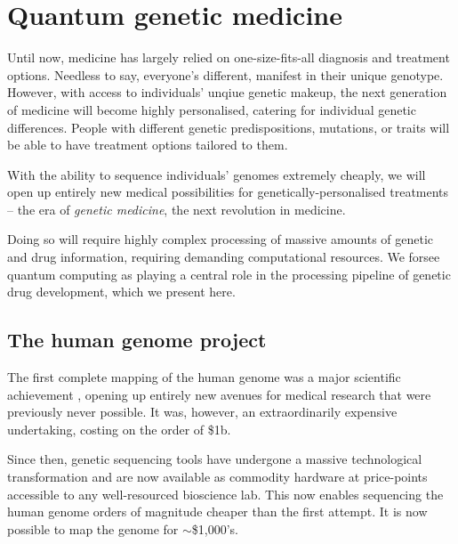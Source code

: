 %
%

\section{Quantum genetic medicine}



Until now, medicine has largely relied on one-size-fits-all diagnosis and treatment options. Needless to say, everyone's different, manifest in their unique genotype. However, with access to individuals' unqiue genetic makeup, the next generation of medicine will become highly personalised, catering for individual genetic differences. People with different genetic predispositions, mutations, or traits will be able to have treatment options tailored to them.

With the ability to sequence individuals' genomes extremely cheaply, we will open up entirely new medical possibilities for genetically-personalised treatments -- the era of \textit{genetic medicine}, the next revolution in medicine.

Doing so will require highly complex processing of massive amounts of genetic and drug information, requiring demanding computational resources. We forsee quantum computing as playing a central role in the processing pipeline of genetic drug development, which we present here.

%
%

\subsection{The human genome project}

The first complete mapping of the human genome was a major scientific achievement \cite{humanGenomeProject}, opening up entirely new avenues for medical research that were previously never possible. It was, however, an extraordinarily expensive undertaking, costing on the order of \$1b.

Since then, genetic sequencing tools have undergone a massive technological transformation and are now available as commodity hardware at price-points accessible to any well-resourced bioscience lab. This now enables sequencing the human genome orders of magnitude cheaper than the first attempt. It is now possible to map the genome for $\sim$\$1,000's.

